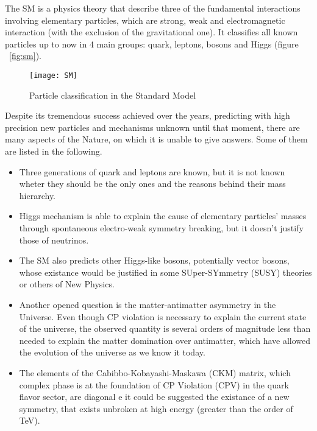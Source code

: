 The SM is a physics theory that describe three of the fundamental interactions involving elementary particles, which are strong, weak and electromagnetic interaction (with the exclusion of the gravitational one). It classifies all known particles up to now in 4 main groups: quark, leptons, bosons and Higgs (figure ~\vref{fig:sm}).


\begin{figure}[h]
\centering
\texttt{[image: SM]}
\caption{Particle classification in the Standard Model}
\label{fig:sm}
\end{figure}

Despite its tremendous success achieved over the years, predicting with high precision new particles and mechanisms unknown until that moment, there are many aspects of the Nature, on which it is unable to give answers. Some of them are listed in the following.

\begin{itemize}
\item Three generations of quark and leptons are known, but it is not known wheter they should be the only ones and the reasons behind their mass hierarchy.
\item Higgs mechanism is able to explain the cause of elementary particles' masses through spontaneous electro-weak symmetry breaking, but it doesn't justify those of neutrinos.
\item The SM also predicts other Higgs-like bosons, potentially vector bosons, whose existance would be justified in some SUper-SYmmetry (SUSY) theories or others of New Physics.
\item Another opened question is the matter-antimatter asymmetry in the Universe. Even though CP violation is necessary to explain the current state of the universe, the observed quantity is several orders of magnitude less than needed to explain the matter domination over antimatter, which have allowed the evolution of the universe as we know it today.
\item The elements of the Cabibbo-Kobayashi-Maskawa (CKM) matrix, which complex phase is at the foundation of CP Violation (CPV) in the quark flavor sector, are diagonal e it could be suggested the existance of a new symmetry, that exists unbroken at high energy (greater than the order of TeV).
\end{itemize}

